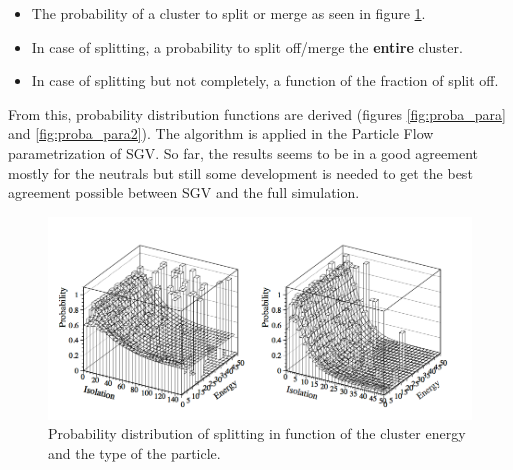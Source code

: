 \begin{itemize}
  \item The probability of a cluster to split or merge as seen in figure \ref{fig:proba_split}.
  \item In case of splitting, a probability to split off/merge the \textbf{entire} cluster.
  \item In case of splitting but not completely, a function of the fraction of split off.
\end{itemize}

From this, probability distribution functions are derived (figures \ref{fig:proba_para} and \ref{fig:proba_para2}). The algorithm is applied in the Particle Flow parametrization of SGV. So far, the results seems to be in a good agreement mostly for the neutrals but still some development is needed to get the best agreement possible between SGV and the full simulation.

\begin{figure}[htbp!]
  \centering
  \includegraphics[width=1\linewidth]{../Thesis_Plots/SGV/Plots/prob_split.png}
  \caption{Probability distribution of splitting in function of the cluster energy and the type of the particle.}
  \label{fig:proba_split}
\end{figure}

